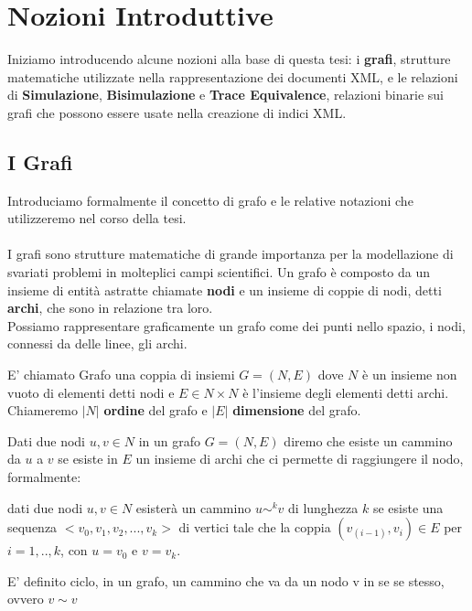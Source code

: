 \chapter{Nozioni Introduttive}
Iniziamo introducendo alcune nozioni alla base di questa tesi: i \textbf{grafi}, strutture matematiche utilizzate nella rappresentazione dei documenti XML, e le relazioni di \textbf{Simulazione}, \textbf{Bisimulazione} e \textbf{Trace Equivalence}, relazioni binarie sui grafi che possono essere usate nella creazione di indici XML.

\section{I Grafi}
Introduciamo formalmente il concetto di grafo e le relative notazioni che utilizzeremo nel corso della tesi.
\\\\
I grafi sono strutture matematiche di grande importanza per la modellazione di svariati problemi in molteplici campi scientifici. Un grafo è composto da un insieme di entità astratte chiamate \textbf{nodi} e un insieme di coppie di nodi, detti \textbf{archi}, che sono in relazione tra loro.\\
Possiamo rappresentare graficamente un grafo come dei punti nello spazio, i nodi, connessi da delle linee, gli archi.

\begin{definition}[Grafo]
E' chiamato Grafo una coppia di insiemi $G = (N,E)$ dove $N$ è un insieme non vuoto di elementi detti nodi e $E \in N \times N $ è l'insieme degli elementi detti archi. Chiameremo $|N|$ \textbf{ordine} del grafo e $|E|$ \textbf{dimensione} del grafo.
\end{definition}

Dati due nodi $u, v \in N$ in un grafo $G = (N,E)$ diremo che esiste un cammino da $u$ a $v$ se esiste in $E$ un insieme di archi che ci permette di raggiungere il nodo, formalmente:

\begin{definition}[Cammino]
dati due nodi $u,v \in N$ esisterà un cammino $u \sim^k v$ di lunghezza $k$ se esiste una sequenza $<v_0,v_1,v_2,...,v_k>$ di vertici tale che la coppia $(v_{(i-1)},v_i) \in E$ per $i = 1,..,k$, con $u = v_0$ e $v = v_k$. 
\end{definition}


\begin{definition}[Ciclo]
E' definito ciclo, in un grafo, un cammino che va da un nodo v in se se stesso, ovvero $v \sim v$
\end{definition}

